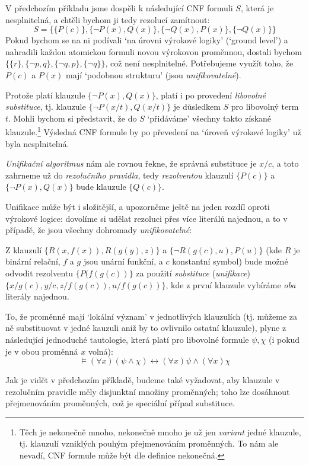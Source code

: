 \begin{example}
    V předchozím příkladu jsme dospěli k následující CNF formuli $S$, která je nesplnitelná, a chtěli bychom ji tedy rezolucí zamítnout:    
    $$
    S = \{\{P(c)\},\{\neg P(x),Q(x)\},\{\neg Q(x),P(x)\},\{\neg Q(x)\}\}
    $$
    Pokud bychom se na ni podívali `na úrovni výrokové logiky' (`ground level') a nahradili každou atomickou formuli novou výrokovou proměnnou, dostali bychom $\{\{r\},\{\neg p,q\},\{\neg q,p\},\{\neg q\}\}$, což není nesplnitelné. Potřebujeme využít toho, že $P(c)$ a $P(x)$ mají `podobnou strukturu' (jsou \emph{unifikovatelné}).

    Protože platí klauzule $\{\neg P(x),Q(x)\}$, platí i po provedení \emph{libovolné substituce}, tj. klauzule $\{\neg P(x/t),Q(x/t)\}$ je důsledkem $S$ pro libovolný term $t$. Mohli bychom si představit, že do  $S$ `přidáváme' všechny takto získané klauzule.\footnote{Těch je nekonečně mnoho, nekonečně mnoho je už jen \emph{variant} jedné klauzule, tj. klauzulí vzniklých pouhým přejmenováním proměnných. To nám ale nevadí, CNF formule může být dle definice nekonečná.} Výsledná CNF formule by po převedení na `úroveň výrokové logiky' už byla nesplnitelná. 
    
    \emph{Unifikační algoritmus} nám ale rovnou řekne, že správná substituce je $x/c$, a toto zahrneme už do \emph{rezolučního pravidla}, tedy \emph{rezolventou} klauzulí $\{P(c)\}$ a $\{\neg P(x),Q(x)\}$ bude klauzule $\{Q(c)\}$.
\end{example}

Unifikace může být i složitější, a upozorněme ještě na jeden rozdíl oproti výrokové logice: dovolíme si udělat rezoluci přes více literálů najednou, a to v případě, že jsou všechny dohromady \emph{unifikovatelné}:

\begin{example}
    Z klauzulí $\{R(x,f(x)),R(g(y),z)\}$ a $\{\neg R(g(c),u),P(u)\}$ (kde $R$ je binární relační, $f$ a $g$ jsou unární funkční, a $c$ konstantní symbol) bude možné odvodit rezolventu $\{P(f(g(c))\}$ za použití \emph{substituce} (\emph{unifikace}) $\{x/g(c),y/c,z/f(g(c)),u/f(g(c))\}$, kde z první klauzule vybíráme \emph{oba} literály najednou.
\end{example}

\begin{remark}
    To, že proměnné mají `lokální význam' v jednotlivých klauzulích (tj. můžeme za ně substituovat v jedné kauzuli aniž by to ovlivnilo ostatní klauzule), plyne z následující jednoduché tautologie, která platí pro libovolné formule $\psi,\chi$ (i pokud je v obou proměnná $x$ volná):
    $$
    \models(\forall x)(\psi \land \chi) \leftrightarrow (\forall x)\psi \land (\forall x)\chi
    $$
    
    Jak je vidět v předchozím příkladě, budeme také vyžadovat, aby klauzule v rezolučním pravidle měly disjunktní množiny proměnných; toho lze dosáhnout přejmenováním proměnných, což je speciální případ substituce.  
\end{remark}


